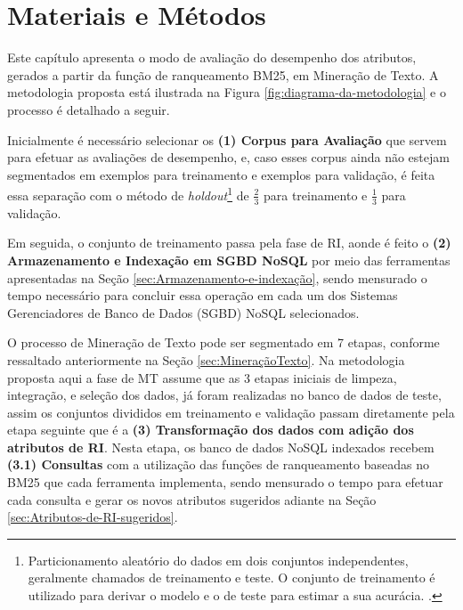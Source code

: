 \chapter{Materiais e Métodos} \label{ch:MateriaisMétodos} %
    Este capítulo apresenta o modo de avaliação do desempenho dos atributos, gerados a partir da função de ranqueamento BM25, em Mineração de Texto.
    A metodologia proposta está ilustrada na Figura \ref{fig:diagrama-da-metodologia} e o processo é detalhado a seguir.
    
    
    
    Inicialmente é necessário selecionar os \textbf{(1) Corpus para Avaliação} que servem para efetuar as avaliações de desempenho, e, caso esses corpus ainda não estejam segmentados em exemplos para treinamento e exemplos para validação, é feita essa separação com o método de \textit{holdout}\footnote{Particionamento aleatório do dados em dois conjuntos independentes, geralmente chamados de treinamento e teste. O conjunto de treinamento é utilizado para derivar o modelo e o de teste para estimar a sua acurácia. \cite[p.~370]{Han:2011:DMC:1972541}.} de $\frac{2}{3}$ para treinamento e $\frac{1}{3}$ para validação.
    
    Em seguida, o conjunto de treinamento passa pela fase de RI, aonde é feito o \textbf{(2) Armazenamento e Indexação em  SGBD NoSQL} por meio das ferramentas apresentadas na Seção  \ref{sec:Armazenamento-e-indexação}, sendo mensurado o tempo necessário para concluir essa operação em cada um dos Sistemas Gerenciadores de Banco de Dados (SGBD) NoSQL selecionados.
    
    O processo de Mineração de Texto pode ser segmentado em 7 etapas, conforme ressaltado anteriormente na Seção \ref{sec:MineraçãoTexto}.
    Na metodologia proposta aqui a fase de MT assume que as 3 etapas iniciais de limpeza, integração, e seleção dos dados, já foram realizadas no banco de dados de teste, assim os conjuntos divididos em treinamento e validação passam diretamente pela etapa seguinte que é a \textbf{(3) Transformação dos dados com adição dos atributos de RI}.
    Nesta etapa, os banco de dados NoSQL indexados recebem \textbf{(3.1) Consultas} com a utilização das funções de ranqueamento baseadas no BM25 que cada ferramenta implementa, sendo mensurado o tempo para efetuar cada consulta e gerar os novos atributos sugeridos adiante na Seção \ref{sec:Atributos-de-RI-sugeridos}.
    
